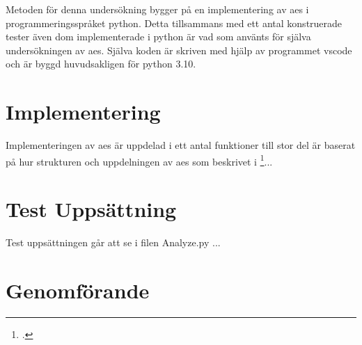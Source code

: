 Metoden för denna undersökning bygger på en implementering av \acrshort{aes} i programmeringsspråket
\gls{python}. Detta tillsammans med ett antal konstruerade tester även dom implementerade i
\gls{python} är vad som använts för själva undersökningen av \acrshort{aes}. Själva koden
är skriven med hjälp av programmet \gls{vscode} och är byggd huvudsakligen för \gls{python} 3.10.

\section{Implementering}
Implementeringen av \acrshort{aes} är uppdelad i ett antal funktioner till stor del är baserat på
hur strukturen och uppdelningen av \acrshort{aes} som beskrivet i \footcite{daemen1999aes}...

\section{Test Uppsättning}
Test uppsättningen går att se i filen Analyze.py ...

\section{Genomförande}